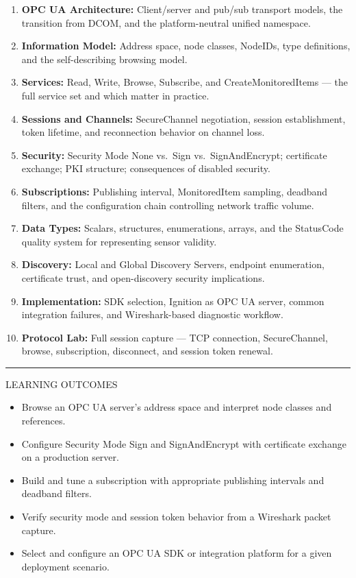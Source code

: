 \documentclass[10pt]{article}
\begin{document}
\begin{enumerate}\small
  \item \textbf{OPC UA Architecture:} Client/server and pub/sub transport models, the transition from DCOM, and the platform-neutral unified namespace.
  \item \textbf{Information Model:} Address space, node classes, NodeIDs, type definitions, and the self-describing browsing model.
  \item \textbf{Services:} Read, Write, Browse, Subscribe, and CreateMonitoredItems — the full service set and which matter in practice.
  \item \textbf{Sessions and Channels:} SecureChannel negotiation, session establishment, token lifetime, and reconnection behavior on channel loss.
  \item \textbf{Security:} Security Mode None vs.\ Sign vs.\ SignAndEncrypt; certificate exchange; PKI structure; consequences of disabled security.
  \item \textbf{Subscriptions:} Publishing interval, MonitoredItem sampling, deadband filters, and the configuration chain controlling network traffic volume.
  \item \textbf{Data Types:} Scalars, structures, enumerations, arrays, and the StatusCode quality system for representing sensor validity.
  \item \textbf{Discovery:} Local and Global Discovery Servers, endpoint enumeration, certificate trust, and open-discovery security implications.
  \item \textbf{Implementation:} SDK selection, Ignition as OPC UA server, common integration failures, and Wireshark-based diagnostic workflow.
  \item \textbf{Protocol Lab:} Full session capture — TCP connection, SecureChannel, browse, subscription, disconnect, and session token renewal.
\end{enumerate}

\smallskip
{\color{unavy}\rule{\linewidth}{0.4pt}}
\smallskip
{\small\sffamily\color{ugray}\MakeUppercase{Learning Outcomes}}
\smallskip

\begin{itemize}\small
  \item Browse an OPC UA server's address space and interpret node classes and references.
  \item Configure Security Mode Sign and SignAndEncrypt with certificate exchange on a production server.
  \item Build and tune a subscription with appropriate publishing intervals and deadband filters.
  \item Verify security mode and session token behavior from a Wireshark packet capture.
  \item Select and configure an OPC UA SDK or integration platform for a given deployment scenario.
\end{itemize}
\end{document}
